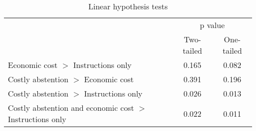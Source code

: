 \begin{table}[H]
\centering
\begin{tabular}{lcc}
\hline
                                      & \multicolumn{2}{c}{p value}       \\ \cline{2-3} 
                                      & Two-tailed & One-tailed \\ \hline
Economic cost $>$ Instructions only     & 0.165           & 0.082           \\
Costly abstention $>$ Economic cost   & 0.391           & 0.196           \\
Costly abstention $>$ Instructions only & 0.026           & 0.013           \\ 
Costly abstention and economic cost $>$ Instructions only & 0.022           & 0.011           \\ \hline
\end{tabular}
\caption{Linear hypothesis tests}
\label{tab: linearhyp}
\end{table}
